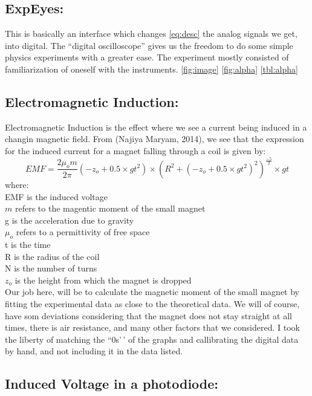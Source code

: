 \documentclass{ieeeconf}
\begin{document}
\subsection{ExpEyes:}

This is basically an interface which changes \ref{eq:desc} the analog signals we get, into digital. The ``digital oscilloscope'' gives us the freedom to do some simple physics experiments with a greater ease. The experiment mostly consisted of familiarization of oneself with the instruments. \ref{fig:image} \ref{fig:alpha} \ref{tbl:alpha}

\subsection{Electromagnetic Induction:}

Electromagnetic Induction is the effect where we see a current being induced in a changin magnetic field. From (Najiya Maryam, 2014), we see that the expression for the induced current for a magnet falling through a coil is given by:
\[ EMF = \frac{2\mu_o m}{2\pi}(-z_o+0.5\times gt^2) \times (R^2+(-z_o+0.5\times gt^2)^2)^\frac{-5}{2}\times gt \]
where:\\
EMF is the induced voltage\\
\(m\) refers to the magentic moment of the small magnet\\
g is the acceleration due to gravity\\
\(\mu_o\) refers to a permittivity of free space\\
t is the time\\
R is the radius of the coil\\
N is the number of turns\\
\(z_o\) is the height from which the magnet is dropped\\
Our job here, will be to calculate the magnetic moment of the small magnet by fitting the experimental data as close to the theoretical data. We will of course, have som deviations considering that the magnet does not stay straight at all times, there is air resistance, and many other factors that we considered. I took the liberty of matching the ``0s'\,' of the graphs and callibrating the digital data by hand, and not including it in the data listed.

\subsection{Induced Voltage in a photodiode:}
\end{document}
